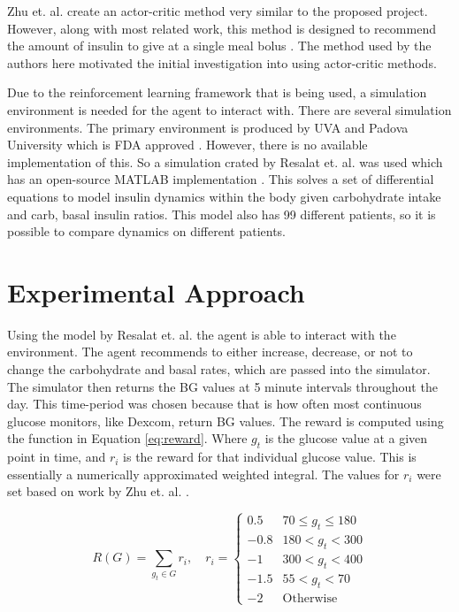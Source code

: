 \documentclass[11pt]{article}
\begin{document}
Zhu et. al. create an actor-critic method very similar to the proposed project.
However, along with most related work, this method is designed to recommend the amount of insulin to give at a single meal bolus \cite{zhu2020insulin}. 
The method used by the authors here motivated the initial investigation into using actor-critic methods. 

Due to the reinforcement learning framework that is being used, a simulation environment is needed for the agent to interact with.
There are several simulation environments. 
The primary environment is produced by UVA and Padova University which is FDA approved \cite{man2014uva}.
However, there is no available implementation of this.
So a simulation crated by Resalat et. al. was used which has an open-source MATLAB implementation \cite{resalat2019statistical}.
This solves a set of differential equations to model insulin dynamics within the body given carbohydrate intake and carb, basal insulin ratios.
This model also has 99 different patients, so it is possible to compare dynamics on different patients.


\section{Experimental Approach}
Using the model by Resalat et. al. \cite{resalat2019statistical} the agent is able to interact with the environment.
The agent recommends to either increase, decrease, or not to change the carbohydrate and basal rates, which are passed into the simulator. 
The simulator then returns the BG values at 5 minute intervals throughout the day.
This time-period was chosen because that is how often most continuous glucose monitors, like Dexcom, return BG values.
The reward is computed using the function in Equation \ref{eq:reward}.
Where $g_t$ is the glucose value at a given point in time, and $r_i$ is the reward for that individual glucose value.
This is essentially a numerically approximated weighted integral.
The values for $r_i$ were set based on work by Zhu et. al. \cite{zhu2020insulin}.

\begin{equation}
    R(G) = \sum_{g_t \in G} r_i, \quad r_i = \begin{cases}
        0.5 & 70 \leq g_t \leq 180 \\
        -0.8 & 180 < g_t < 300 \\
        -1 & 300 < g_t < 400 \\
        -1.5 & 55 < g_t < 70 \\
        -2 & \text{Otherwise}
    \end{cases}
    \label{eq:reward}
\end{equation}
\end{document}

